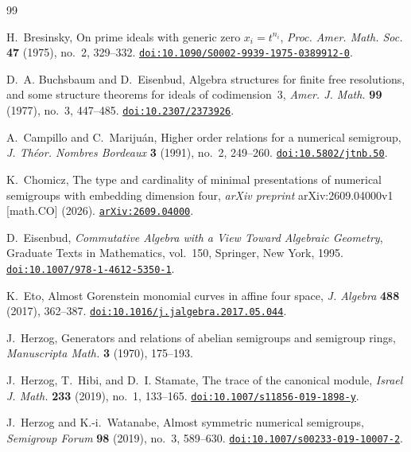 \documentclass[10pt]{amsart}
\theoremstyle{plain}
\begin{document}
\begin{thebibliography}{99}

H.~Bresinsky,
On prime ideals with generic zero \(x_i=t^{n_i}\),
\emph{Proc. Amer. Math. Soc.} \textbf{47} (1975), no.~2, 329--332.
\href{https://doi.org/10.1090/S0002-9939-1975-0389912-0}{\nolinkurl{doi:10.1090/S0002-9939-1975-0389912-0}}.

D.~A. Buchsbaum and D.~Eisenbud,
Algebra structures for finite free resolutions, and some structure theorems
for ideals of codimension~\(3\),
\emph{Amer. J. Math.} \textbf{99} (1977), no.~3, 447--485.
\href{https://doi.org/10.2307/2373926}{\nolinkurl{doi:10.2307/2373926}}.

A.~Campillo and C.~Mariju\'an,
Higher order relations for a numerical semigroup,
\emph{J. Th\'eor. Nombres Bordeaux} \textbf{3} (1991), no.~2, 249--260.
\href{https://doi.org/10.5802/jtnb.50}{\nolinkurl{doi:10.5802/jtnb.50}}.

K.~Chomicz,
The type and cardinality of minimal presentations of numerical semigroups
with embedding dimension four,
\emph{arXiv preprint} arXiv:2609.04000v1 [math.CO] (2026).
\href{https://arxiv.org/abs/2609.04000}{\nolinkurl{arXiv:2609.04000}}.

D.~Eisenbud,
\emph{Commutative Algebra with a View Toward Algebraic Geometry},
Graduate Texts in Mathematics, vol.~150, Springer, New York, 1995.
\href{https://doi.org/10.1007/978-1-4612-5350-1}{\nolinkurl{doi:10.1007/978-1-4612-5350-1}}.

K.~Eto,
Almost Gorenstein monomial curves in affine four space,
\emph{J. Algebra} \textbf{488} (2017), 362--387.
\href{https://doi.org/10.1016/j.jalgebra.2017.05.044}{\nolinkurl{doi:10.1016/j.jalgebra.2017.05.044}}.

J.~Herzog,
Generators and relations of abelian semigroups and semigroup rings,
\emph{Manuscripta Math.} \textbf{3} (1970), 175--193.

J.~Herzog, T.~Hibi, and D.~I. Stamate,
The trace of the canonical module,
\emph{Israel J. Math.} \textbf{233} (2019), no.~1, 133--165.
\href{https://doi.org/10.1007/s11856-019-1898-y}{\nolinkurl{doi:10.1007/s11856-019-1898-y}}.

J.~Herzog and K.-i.~Watanabe,
Almost symmetric numerical semigroups,
\emph{Semigroup Forum} \textbf{98} (2019), no.~3, 589--630.
\href{https://doi.org/10.1007/s00233-019-10007-2}{\nolinkurl{doi:10.1007/s00233-019-10007-2}}.


\end{thebibliography}
\end{document}
